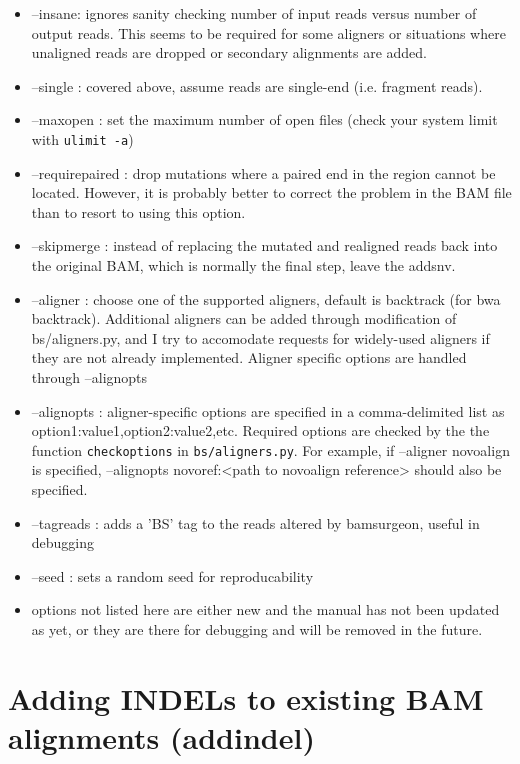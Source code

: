 \documentclass[letterpaper,11pt]{article}
\begin{document}
\begin{itemize}
\item --insane: ignores sanity checking number of input reads versus number of output reads. This seems to be required for some aligners or situations where unaligned reads are dropped or secondary alignments are added.
\item --single : covered above, assume reads are single-end (i.e. fragment reads).
\item --maxopen : set the maximum number of open files (check your system limit with \texttt{ulimit -a})
\item --requirepaired : drop mutations where a paired end in the region cannot be located. However, it is probably better to correct the problem in the BAM file than to resort to using this option.
\item --skipmerge : instead of replacing the mutated and realigned reads back into the original BAM, which is normally the final step, leave the addsnv.
\item --aligner : choose one of the supported aligners, default is backtrack (for bwa backtrack). Additional aligners can be added through modification of bs/aligners.py, and I try to accomodate requests for widely-used aligners if they are not already implemented. Aligner specific options are handled through --alignopts
\item --alignopts : aligner-specific options are specified in a comma-delimited list as option1:value1,option2:value2,etc. Required options are checked by the the function \texttt{checkoptions} in \texttt{bs/aligners.py}. For example, if --aligner novoalign is specified, --alignopts novoref:<path to novoalign reference> should also be specified.
\item --tagreads : adds a 'BS' tag to the reads altered by bamsurgeon, useful in debugging
\item --seed : sets a random seed for reproducability
\item options not listed here are either new and the manual has not been updated as yet, or they are there for debugging and will be removed in the future.
\end{itemize}


\section{Adding INDELs to existing BAM alignments (addindel)}
\end{document}
